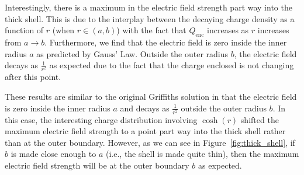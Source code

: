 \documentclass{article}
\begin{document}
Interestingly, there is a maximum in the electric field strength part way into the thick shell. This is due to the interplay between the decaying charge density as a function of $r$ (when $r\in(a,b)$) with the fact that $Q_\textrm{enc}$ increases as $r$ increases from $a\to b$. Furthermore, we find that the electric field is zero inside the inner radius $a$ as predicted by Gauss' Law. Outside the outer radius $b$, the electric field decays as $\frac{1}{r^2}$ as expected due to the fact that the charge enclosed is not changing after this point.

These results are similar to the original Griffiths solution in that the electric field is zero inside the inner radius $a$ and decays as $\frac{1}{r^2}$ outside the outer radius $b$. In this case, the interesting charge distribution involving $\cosh(r)$ shifted the maximum electric field strength to a point part way into the thick shell rather than at the outer boundary. However, as we can see in Figure~\ref{fig:thick_shell}, if $b$ is made close enough to $a$ (i.e., the shell is made quite thin), then the maximum electric field strength will be at the outer boundary $b$ as expected.
\clearpage
\end{document}
